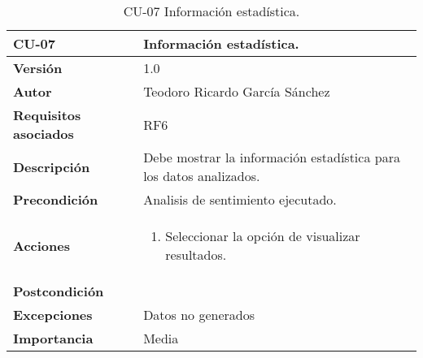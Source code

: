 \begin{table}[p]
	\centering
	\begin{tabularx}{\linewidth}{ p{} p{} }
		\toprule
		\textbf{CU-07}    & \textbf{Información estadística.}\\
		\toprule
		\textbf{Versión}              & 1.0    \\
		\textbf{Autor}                & Teodoro Ricardo García Sánchez \\
		\textbf{Requisitos asociados} & RF6 \\
		\textbf{Descripción}          & Debe mostrar la información estadística para los datos analizados.  \\
		\textbf{Precondición}         & Analisis de sentimiento ejecutado. \\
		\textbf{Acciones}             &
		\begin{enumerate}
			\def\labelenumi{\arabic{enumi}.}
			\tightlist
			\item Seleccionar la opción de visualizar resultados.
		\end{enumerate}\\
		\textbf{Postcondición}        &  \\
		\textbf{Excepciones}          & Datos no generados \\
		\textbf{Importancia}          & Media \\
		\bottomrule
	\end{tabularx}
	\caption{CU-07 Información estadística.}
\end{table}

